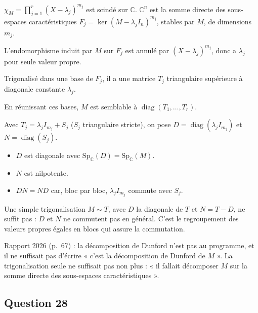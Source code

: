 \documentclass[11pt,a4paper]{article}
\providecommand{\tightlist}{\setlength{\itemsep}{0pt}\setlength{\parskip}{0pt}}
\begin{document}
\(\chi_M=\prod_{j=1}^r(X-\lambda_j)^{m_j}\) est scindé sur \(\mathbb{C}\). \({\mathbb{C}}^n\) est la somme directe des sous-espaces caractéristiques \(F_j=\ker(M-\lambda_jI_n)^{m_j}\), stables par \(M\), de dimensions \(m_j\).

L'endomorphisme induit par \(M\) sur \(F_j\) est annulé par \((X-\lambda_j)^{m_j}\), donc a \(\lambda_j\) pour seule valeur propre.

Trigonalisé dans une base de \(F_j\), il a une matrice \(T_j\) triangulaire supérieure à diagonale constante \(\lambda_j\).

En réunissant ces bases, \(M\) est semblable à \(\operatorname{diag}(T_1,\dots,T_r)\).

Avec \(T_j=\lambda_jI_{m_j}+S_j\) (\(S_j\) triangulaire stricte), on pose \(D=\operatorname{diag}(\lambda_jI_{m_j})\) et \(N=\operatorname{diag}(S_j)\).

\begin{itemize}
\tightlist
\item
  \(D\) est diagonale avec \({\mathrm{Sp}}_{\mathbb{C}}(D)={\mathrm{Sp}}_{\mathbb{C}}(M)\).
\item
  \(N\) est nilpotente.
\item
  \textbf{\(DN=ND\)} car, bloc par bloc, \(\lambda_jI_{m_j}\) commute avec \(S_j\).
\end{itemize}

\begin{piege}

Une simple trigonalisation \(M\sim T\), avec \(D\) la diagonale de \(T\) et \(N=T-D\), ne suffit pas : \(D\) et \(N\) ne commutent pas en général. C'est le regroupement des valeurs propres égales en blocs qui assure la commutation.

\end{piege}

\begin{jury}

Rapport 2026 (p.~67) : la décomposition de Dunford n'est pas au programme, et il ne suffisait pas d'écrire « c'est la décomposition de Dunford de \(M\) ». La trigonalisation seule ne suffisait pas non plus : « il fallait décomposer \(M\) sur la somme directe des sous-espaces caractéristiques ».

\end{jury}

\hypertarget{question-28}{%
\subsection{Question 28}\label{question-28}}
\end{document}
